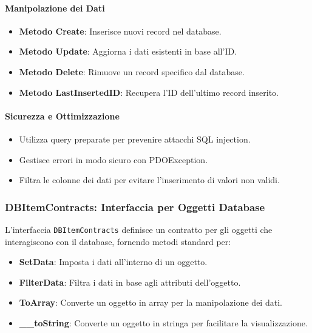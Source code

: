 \paragraph{Manipolazione dei Dati}
\begin{itemize}
    \item \textbf{Metodo Create}: Inserisce nuovi record nel database.
    \item \textbf{Metodo Update}: Aggiorna i dati esistenti in base all'ID.
    \item \textbf{Metodo Delete}: Rimuove un record specifico dal database.
    \item \textbf{Metodo LastInsertedID}: Recupera l'ID dell'ultimo record inserito.
\end{itemize}

\paragraph{Sicurezza e Ottimizzazione}
\begin{itemize}
    \item Utilizza query preparate per prevenire attacchi SQL injection.
    \item Gestisce errori in modo sicuro con PDOException.
    \item Filtra le colonne dei dati per evitare l'inserimento di valori non validi.
\end{itemize}

\subsubsection{DBItemContracts: Interfaccia per Oggetti Database}
L'interfaccia \texttt{DBItemContracts} definisce un contratto per gli oggetti che interagiscono con il database, fornendo metodi standard per:
\begin{itemize}
    \item \textbf{SetData}: Imposta i dati all'interno di un oggetto.
    \item \textbf{FilterData}: Filtra i dati in base agli attributi dell'oggetto.
    \item \textbf{ToArray}: Converte un oggetto in array per la manipolazione dei dati.
    \item \textbf{\_\_toString}: Converte un oggetto in stringa per facilitare la visualizzazione.
\end{itemize}

